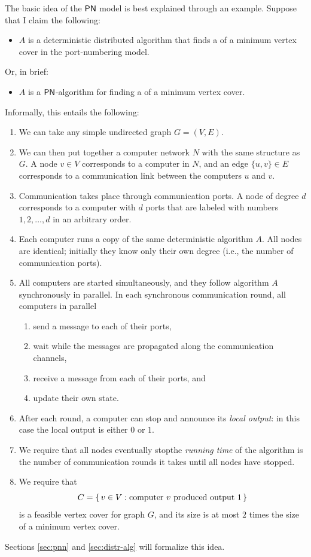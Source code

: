 The basic idea of the $\textup{\sffamily PN}$ model is best explained through an example. Suppose that I claim the following:
\begin{itemize}
    \item $A$ is a deterministic distributed algorithm that finds a  of a minimum vertex cover in the port-numbering model.
\end{itemize}
Or, in brief:
\begin{itemize}
    \item $A$ is a $\textup{\sffamily PN}$-algorithm for finding a  of a minimum vertex cover.
\end{itemize}
Informally, this entails the following:
\begin{enumerate}
    \item We can take any simple undirected graph $G = (V,E)$.
    \item We can then put together a computer network $N$ with the same structure as $G$. A node $v \in V$ corresponds to a computer in $N$, and an edge $\{u,v\} \in E$ corresponds to a communication link between the computers $u$ and $v$.
    \item Communication takes place through communication ports. A node of degree $d$ corresponds to a computer with $d$ ports that are labeled with numbers $1, 2, \dotsc, d$ in an arbitrary order.
    \item Each computer runs a copy of the same deterministic algorithm $A$. All nodes are identical; initially they know only their own degree (i.e., the number of communication ports).
    \item All computers are started simultaneously, and they follow algorithm $A$ synchronously in parallel. In each synchronous communication round, all computers in parallel
    \begin{enumerate}[label=(\arabic*)]
        \item send a message to each of their ports,
        \item wait while the messages are propagated along the communication channels,
        \item receive a message from each of their ports, and
        \item update their own state.
    \end{enumerate}
    \item After each round, a computer can stop and announce its \emph{local output}: in this case the local output is either $0$ or $1$.
    \item We require that all nodes eventually stop\mydash the \emph{running time} of the algorithm is the number of communication rounds it takes until all nodes have stopped.
    \item We require that
        \[ C = \{\,  v \in V : \text{computer $v$ produced output $1$}  \,\} \]
        is a feasible vertex cover for graph $G$, and its size is at most $2$ times the size of a minimum vertex cover. 
\end{enumerate}
Sections \ref{sec:pnn} and \ref{sec:distr-alg} will formalize this idea.


